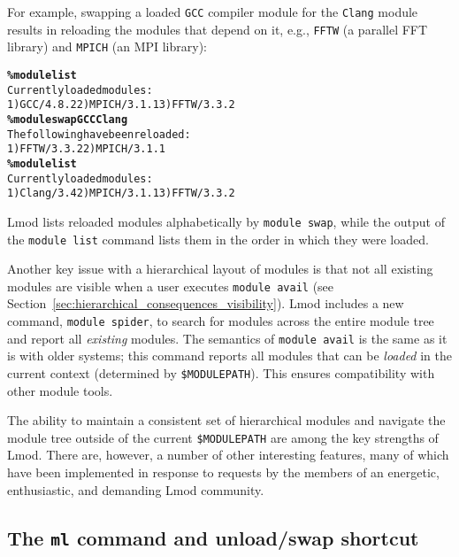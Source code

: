 For example, swapping a loaded \texttt{\small GCC} compiler module for the
\texttt{\small {Clang}} module results in reloading the modules that
depend on it, e.g., \texttt{\small FFTW} (a parallel FFT library) and
\texttt{\small MPICH} (an MPI library):
{\small
  \begin{alltt}
    \textbf{\% module list}
    Currently loaded modules:
    1) GCC/4.8.2  2) MPICH/3.1.1  3) FFTW/3.3.2
    \textbf{\% module swap GCC Clang}
    The following have been reloaded:
    1) FFTW/3.3.2  2) MPICH/3.1.1
    \textbf{\% module list}
    Currently loaded modules:
    1) Clang/3.4  2) MPICH/3.1.1  3) FFTW/3.3.2
\end{alltt}
}
\noindent
Lmod lists reloaded modules
alphabetically by \texttt{\small module swap}, while the output of
the \texttt{\small module list} command lists them in the order in which
they were loaded.


Another key issue with a hierarchical layout of modules is that not all
existing modules are visible when a user executes \texttt{\small module avail} (see
Section~\ref{sec:hierarchical_consequences_visibility}). Lmod includes a
new command, \texttt{\small module spider}, to search for modules across the
entire module tree and report all \emph{existing} modules. The semantics of
\texttt{\small module avail} is the same
as it is with older systems; this command reports  all modules that can
be \emph{loaded} in the current context (determined by
\texttt{\small \$MODULEPATH}). This ensures compatibility with other module
tools.

The ability to maintain a consistent set of hierarchical modules and navigate the module tree outside of the
current \texttt{\small \$MODULEPATH} are among the key strengths of Lmod. There are, however, a number of
other interesting features, many of which have been implemented in
response to requests by the members of an energetic, enthusiastic, and demanding Lmod community.

\subsection{The \texttt{\small ml} command and unload/swap shortcut}

